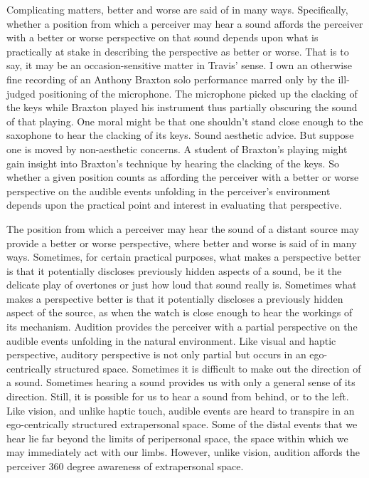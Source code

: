 Complicating matters, better and worse are said of in many ways. Specifically, whether a position from which a perceiver may hear a sound affords the perceiver with a better or worse perspective on that sound depends upon what is practically at stake in describing the perspective as better or worse. That is to say, it may be an occasion-sensitive matter in Travis' \citeyearpar{Travis:2008la} sense. I own an otherwise fine recording of an Anthony Braxton solo performance marred only by the ill-judged positioning of the microphone. The microphone picked up the clacking of the keys while Braxton played his instrument thus partially obscuring the sound of that playing. One moral might be that one shouldn't stand close enough to the saxophone to hear the clacking of its keys. Sound aesthetic advice. But suppose one is moved by non-aesthetic concerns. A student of Braxton's playing might gain insight into Braxton's technique by hearing the clacking of the keys. So whether a given position counts as affording the perceiver with a better or worse perspective on the audible events unfolding in the perceiver's environment depends upon the practical point and interest in evaluating that perspective.

The position from which a perceiver may hear the sound of a distant source may provide a better or worse perspective, where better and worse is said of in many ways. Sometimes, for certain practical purposes, what makes a perspective better is that it potentially discloses previously hidden aspects of a sound, be it the delicate play of overtones or just how loud that sound really is. Sometimes what makes a perspective better is that it potentially discloses a previously hidden aspect of the source, as when the watch is close enough to hear the workings of its mechanism. Audition provides the perceiver with a partial perspective on the audible events unfolding in the natural environment. Like visual and haptic perspective, auditory perspective is not only partial but occurs in an ego-centrically structured space. Sometimes it is difficult to make out the direction of a sound. Sometimes hearing a sound provides us with only a general sense of its direction. Still, it is possible for us to hear a sound from behind, or to the left. Like vision, and unlike haptic touch, audible events are heard to transpire in an ego-centrically structured extrapersonal space. Some of the distal events that we hear lie far beyond the limits of peripersonal space, the space within which we may immediately act with our limbs. However, unlike vision, audition affords the perceiver 360 degree awareness of extrapersonal space. 

